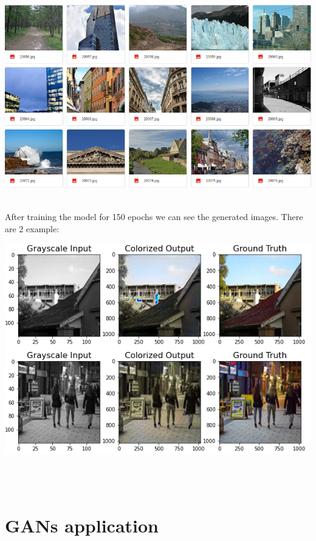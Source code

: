 \documentclass[14pt]{article}
\begin{document}
\begin{center}
    \includegraphics[width = 12 cm ]{23.png}
    \\ \\ 
\end{center} 
After training the model for 150 epochs we can see the generated images. There are 2 example: \\
\begin{center}
    \includegraphics[width = 12 cm ]{24.png}
    \\ \\ 
\end{center} 



\\
\section{GANs application}
\end{document}
